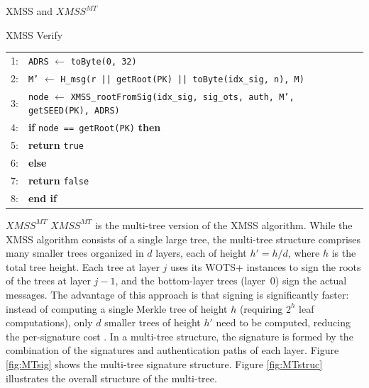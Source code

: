 \documentclass[version=preprint]{iacrcc}
\begin{document}
\begin{section}{XMSS and \texorpdfstring{$XMSS^{MT}$}{XMSS MT}}
\begin{subsection}{XMSS Verify}
\begin{algorithm}
        \vspace{0.2cm}
        
        \begin{tabular}{ll}
        1: & \texttt{ADRS} $\leftarrow$ \texttt{toByte(0, 32)} \\
        2: & \texttt{M'} $\leftarrow$ \texttt{H\_msg(r || getRoot(PK) || toByte(idx\_sig, n), M)} \\
        3: & \texttt{node} $\leftarrow$ \texttt{XMSS\_rootFromSig(idx\_sig, sig\_ots, auth, M', getSEED(PK), ADRS)} \\
        4: & \textbf{if} \texttt{node == getRoot(PK)} \textbf{then} \\
        5: & \hspace{0.5cm} \textbf{return} \texttt{true} \\
        6: & \textbf{else} \\
        7: & \hspace{0.5cm} \textbf{return} \texttt{false} \\
        8: & \textbf{end if}
        \end{tabular}
        
        \end{algorithm}
        
    \end{subsection}

    \begin{subsection}{\texorpdfstring{$XMSS^{MT}$}{XMSS MT}}
        \texorpdfstring{$XMSS^{MT}$}{XMSS MT} is the multi-tree version of the XMSS algorithm. While the XMSS algorithm consists of a single large tree, the multi-tree structure comprises many smaller trees organized in $d$ layers, each of height $h' = h/d$, where $h$ is the total tree height. Each tree at layer $j$ uses its WOTS+ instances to sign the roots of the trees at layer $j-1$, and the bottom-layer trees (layer~0) sign the actual messages. The advantage of this approach is that signing is significantly faster: instead of computing a single Merkle tree of height $h$ (requiring $2^h$ leaf computations), only $d$ smaller trees of height $h'$ need to be computed, reducing the per-signature cost \cite{huelsing2018rfc}. In a multi-tree structure, the signature is formed by the combination of the signatures and authentication paths of each layer. Figure \ref{fig:MTsig} shows the multi-tree signature structure. Figure \ref{fig:MTstruc} illustrates the overall structure of the multi-tree.

        



\end{subsection}
\end{section}
\end{document}
